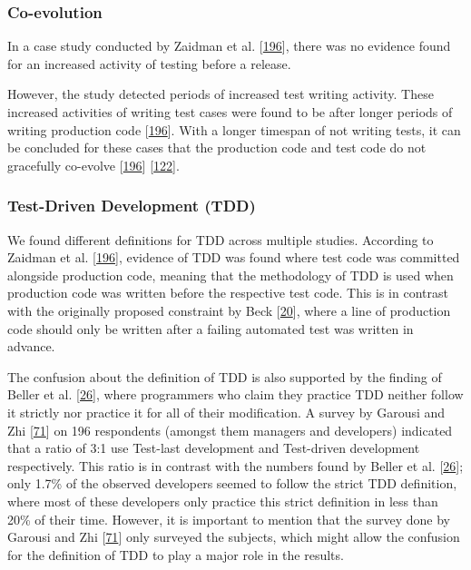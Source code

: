 \documentclass[]{book}
\begin{document}
\subsubsection{Co-evolution}\label{co-evolution}

In a case study conducted by Zaidman et al.
{[}\protect\hyperlink{ref-zaidman2011studying}{196}{]}, there was no
evidence found for an increased activity of testing before a release.

However, the study detected periods of increased test writing activity.
These increased activities of writing test cases were found to be after
longer periods of writing production code
{[}\protect\hyperlink{ref-zaidman2011studying}{196}{]}. With a longer
timespan of not writing tests, it can be concluded for these cases that
the production code and test code do not gracefully co-evolve
{[}\protect\hyperlink{ref-zaidman2011studying}{196}{]}
{[}\protect\hyperlink{ref-marsavina2014}{122}{]}.

\subsubsection{Test-Driven Development
(TDD)}\label{test-driven-development-tdd}

We found different definitions for TDD across multiple studies.
According to Zaidman et al.
{[}\protect\hyperlink{ref-zaidman2011studying}{196}{]}, evidence of TDD
was found where test code was committed alongside production code,
meaning that the methodology of TDD is used when production code was
written before the respective test code. This is in contrast with the
originally proposed constraint by Beck
{[}\protect\hyperlink{ref-beck2003test}{20}{]}, where a line of
production code should only be written after a failing automated test
was written in advance.

The confusion about the definition of TDD is also supported by the
finding of Beller et al. {[}\protect\hyperlink{ref-beller2015}{26}{]},
where programmers who claim they practice TDD neither follow it strictly
nor practice it for all of their modification. A survey by Garousi and
Zhi {[}\protect\hyperlink{ref-GAROUSI20131354}{71}{]} on 196 respondents
(amongst them managers and developers) indicated that a ratio of 3:1 use
Test-last development and Test-driven development respectively. This
ratio is in contrast with the numbers found by Beller et al.
{[}\protect\hyperlink{ref-beller2015}{26}{]}; only 1.7\% of the observed
developers seemed to follow the strict TDD definition, where most of
these developers only practice this strict definition in less than 20\%
of their time. However, it is important to mention that the survey done
by Garousi and Zhi {[}\protect\hyperlink{ref-GAROUSI20131354}{71}{]}
only surveyed the subjects, which might allow the confusion for the
definition of TDD to play a major role in the results.
\end{document}
